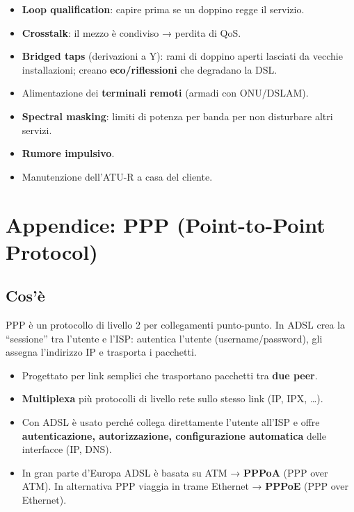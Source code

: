 \begin{itemize}
\tightlist
\item
  \textbf{Loop qualification}: capire prima se un doppino regge il servizio.
\item
  \textbf{Crosstalk}: il mezzo è condiviso → perdita di QoS.
\item
  \textbf{Bridged taps} (derivazioni a Y): rami di doppino aperti lasciati da vecchie installazioni; creano \textbf{eco/riflessioni} che degradano la DSL.
\item
  Alimentazione dei \textbf{terminali remoti} (armadi con ONU/DSLAM).
\item
  \textbf{Spectral masking}: limiti di potenza per banda per non disturbare altri servizi.
\item
  \textbf{Rumore impulsivo}.
\item
  Manutenzione dell'ATU-R a casa del cliente.
\end{itemize}

\section{Appendice: PPP (Point-to-Point Protocol)}

\subsection{Cos'è}

\begin{inbreve}

PPP è un protocollo di livello 2 per collegamenti punto-punto. In ADSL crea la ``sessione'' tra l'utente e l'ISP: autentica l'utente (username/password), gli assegna l'indirizzo IP e trasporta i pacchetti.

\end{inbreve}

\begin{itemize}
\tightlist
\item
  Progettato per link semplici che trasportano pacchetti tra \textbf{due peer}.
\item
  \textbf{Multiplexa} più protocolli di livello rete sullo stesso link (IP, IPX, \ldots).
\item
  Con ADSL è usato perché collega direttamente l'utente all'ISP e offre \textbf{autenticazione, autorizzazione, configurazione automatica} delle interfacce (IP, DNS).
\item
  In gran parte d'Europa ADSL è basata su ATM → \textbf{PPPoA} (PPP over ATM). In alternativa PPP viaggia in trame Ethernet → \textbf{PPPoE} (PPP over Ethernet).
\end{itemize}

